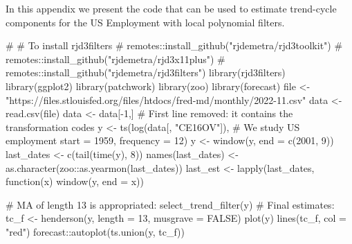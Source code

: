 \documentclass[
]{article}
\newenvironment{Shaded}{\begin{snugshade}}{\end{snugshade}}
\newcommand{\AttributeTok}[1]{\textcolor[rgb]{0.40,0.45,0.13}{#1}}
\newcommand{\CommentTok}[1]{\textcolor[rgb]{0.37,0.37,0.37}{#1}}
\newcommand{\ConstantTok}[1]{\textcolor[rgb]{0.56,0.35,0.01}{#1}}
\newcommand{\ControlFlowTok}[1]{\textcolor[rgb]{0.00,0.23,0.31}{#1}}
\newcommand{\DecValTok}[1]{\textcolor[rgb]{0.68,0.00,0.00}{#1}}
\newcommand{\FunctionTok}[1]{\textcolor[rgb]{0.28,0.35,0.67}{#1}}
\newcommand{\NormalTok}[1]{\textcolor[rgb]{0.00,0.23,0.31}{#1}}
\newcommand{\OtherTok}[1]{\textcolor[rgb]{0.00,0.23,0.31}{#1}}
\newcommand{\SpecialCharTok}[1]{\textcolor[rgb]{0.37,0.37,0.37}{#1}}
\newcommand{\StringTok}[1]{\textcolor[rgb]{0.13,0.47,0.30}{#1}}
\newcommand\1{\mathds{1}}
\begin{document}
In this appendix we present the  code that can be used
to estimate trend-cycle components for the US Employment with local
polynomial filters.

\begin{Shaded}
\begin{Highlighting}[]
\CommentTok{\# \# To install rjd3filters}
\CommentTok{\# remotes::install\_github("rjdemetra/rjd3toolkit")}
\CommentTok{\# remotes::install\_github("rjdemetra/rjd3x11plus")}
\CommentTok{\# remotes::install\_github("rjdemetra/rjd3filters")}
\FunctionTok{library}\NormalTok{(rjd3filters)}
\FunctionTok{library}\NormalTok{(ggplot2)}
\FunctionTok{library}\NormalTok{(patchwork)}
\FunctionTok{library}\NormalTok{(zoo)}
\FunctionTok{library}\NormalTok{(forecast)}
\NormalTok{file }\OtherTok{\textless{}{-}}\StringTok{"https://files.stlouisfed.org/files/htdocs/fred{-}md/monthly/2022{-}11.csv"}
\NormalTok{data }\OtherTok{\textless{}{-}} \FunctionTok{read.csv}\NormalTok{(file)}
\NormalTok{data }\OtherTok{\textless{}{-}}\NormalTok{ data[}\SpecialCharTok{{-}}\DecValTok{1}\NormalTok{,] }\CommentTok{\# First line removed: it contains the transformation codes}
\NormalTok{y }\OtherTok{\textless{}{-}} \FunctionTok{ts}\NormalTok{(}\FunctionTok{log}\NormalTok{(data[, }\StringTok{"CE16OV"}\NormalTok{]), }\CommentTok{\# We study US employment}
         \AttributeTok{start =} \DecValTok{1959}\NormalTok{, }\AttributeTok{frequency =} \DecValTok{12}\NormalTok{)}
\NormalTok{y }\OtherTok{\textless{}{-}} \FunctionTok{window}\NormalTok{(y, }\AttributeTok{end =} \FunctionTok{c}\NormalTok{(}\DecValTok{2001}\NormalTok{, }\DecValTok{9}\NormalTok{))}
\NormalTok{last\_dates }\OtherTok{\textless{}{-}} \FunctionTok{c}\NormalTok{(}\FunctionTok{tail}\NormalTok{(}\FunctionTok{time}\NormalTok{(y), }\DecValTok{8}\NormalTok{))}
\FunctionTok{names}\NormalTok{(last\_dates) }\OtherTok{\textless{}{-}} \FunctionTok{as.character}\NormalTok{(zoo}\SpecialCharTok{::}\FunctionTok{as.yearmon}\NormalTok{(last\_dates))}
\NormalTok{last\_est }\OtherTok{\textless{}{-}} \FunctionTok{lapply}\NormalTok{(last\_dates, }\ControlFlowTok{function}\NormalTok{(x) }\FunctionTok{window}\NormalTok{(y, }\AttributeTok{end =}\NormalTok{ x))}

\CommentTok{\# MA of length 13 is appropriated:}
\FunctionTok{select\_trend\_filter}\NormalTok{(y)}
\CommentTok{\# Final estimates:}
\NormalTok{tc\_f }\OtherTok{\textless{}{-}} \FunctionTok{henderson}\NormalTok{(y, }\AttributeTok{length =} \DecValTok{13}\NormalTok{, }\AttributeTok{musgrave =} \ConstantTok{FALSE}\NormalTok{)}
\FunctionTok{plot}\NormalTok{(y)}
\FunctionTok{lines}\NormalTok{(tc\_f, }\AttributeTok{col =} \StringTok{"red"}\NormalTok{)}
\NormalTok{forecast}\SpecialCharTok{::}\FunctionTok{autoplot}\NormalTok{(}\FunctionTok{ts.union}\NormalTok{(y, tc\_f))}


\end{Highlighting}
\end{Shaded}
\end{document}
